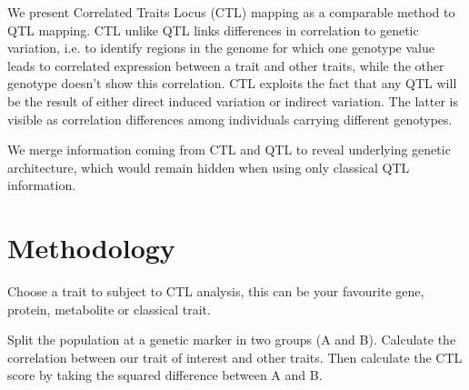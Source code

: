 \documentclass{bioinfo}
\begin{document}
  We present Correlated Traits Locus (CTL) mapping as a comparable method to QTL mapping.
  CTL unlike QTL links differences in correlation to genetic variation, i.e. to identify regions in the 
  genome for which one genotype value leads to correlated expression between a trait and  
  other traits, while the other genotype doesn't show this correlation. CTL exploits the fact that 
  any QTL will be the result of either direct induced variation or indirect variation. The latter is 
  visible as correlation differences among individuals carrying different genotypes.
  
  We merge information coming from CTL and QTL to reveal underlying genetic architecture, which 
  would remain hidden when using only classical QTL information.

\section{Methodology}
  Choose a trait to subject to CTL analysis, this can be your favourite gene, 
  protein, metabolite or classical trait.

  Split the population at a genetic marker in two groups (A and B). Calculate the correlation 
  between our trait of interest and other traits. Then calculate the CTL score by taking the 
  squared difference between A and B.
\end{document}
